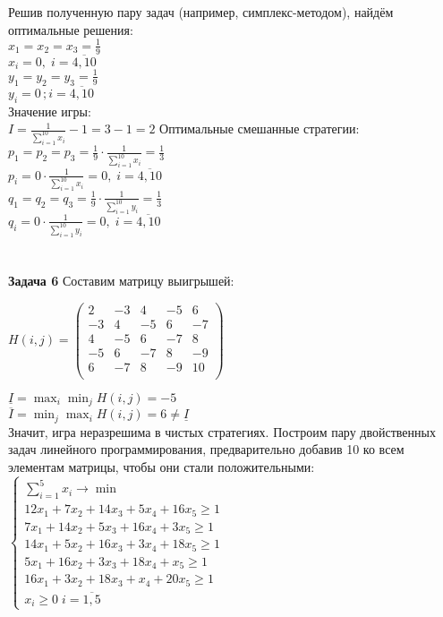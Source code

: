 \documentclass[a4paper,14pt]{extreport}
\begin{document}
Решив полученную пару задач (например, симплекс-методом), найдём оптимальные решения:\\
$x_1 = x_2 = x_3 = \frac{1}{9}$ \\
$x_i = 0,\; i=\overline{4, 10}$ \\
$y_1 = y_2 = y_3 = \frac{1}{9}$ \\
$y_i = 0\,; i=\overline{4, 10}$ \\
Значение игры: \\
$\displaystyle I = \frac{1}{\sum_{i=1}^{10}x_i} - 1 = 3 - 1 = 2$
Оптимальные смешанные стратегии: \\
$\displaystyle p_1 = p_2 = p_3 = \frac{1}{9}\cdot \frac{1}{\sum_{i=1}^{10}x_i} = \frac{1}{3}$ \\
$\displaystyle p_i = 0\cdot \frac{1}{\sum_{i=1}^{10}x_i} = 0, \; i=\overline{4, 10}$ \\
$\displaystyle q_1 = q_2 = q_3 = \frac{1}{9}\cdot \frac{1}{\sum_{i=1}^{10}y_i} = \frac{1}{3}$ \\
$\displaystyle q_i = 0\cdot \frac{1}{\sum_{i=1}^{10}y_i} = 0, \; i=\overline{4, 10}$ \\
\\
\\
\textbf{Задача 6}
Составим матрицу выигрышей:
\begin{center}
$H(i, j) =
 \begin{pmatrix}
  2 & -3 & 4 & -5 & 6 \\
  -3 & 4 & -5 & 6 & -7 \\
  4 & -5 & 6 & -7 & 8 \\
  -5 & 6 & -7 & 8 & -9 \\
  6 & -7 & 8 & -9 & 10 \\
 \end{pmatrix}$
\end{center}
$\displaystyle\underline{I} = \max_{i}\min_{j}H(i, j) = -5$ \\
$\displaystyle\overline{I} = \min_{j}\max_{i}H(i, j) = 6 \neq \underline{I}$ \\
Значит, игра неразрешима в чистых стратегиях. Построим пару двойственных задач линейного программирования, предварительно добавив 10 ко всем элементам матрицы, чтобы они стали положительными: \\
$\begin{cases}
\displaystyle\sum_{i=1}^{5}x_i \to \min \\
12x_1 + 7x_2 + 14x_3 + 5x_4 + 16x_5 \geq 1 \\
7x_1 + 14x_2 + 5x_3 + 16x_4 + 3x_5 \geq 1 \\
14x_1 + 5x_2 + 16x_3 + 3x_4 + 18x_5 \geq 1 \\
5x_1 + 16x_2 + 3x_3 + 18x_4 + x_5 \geq 1 \\
16x_1 + 3x_2 + 18x_3 + x_4 + 20x_5 \geq 1 \\

x_i \geq 0\; i=\overline{1, 5}
\end{cases}$\\
\end{document}
